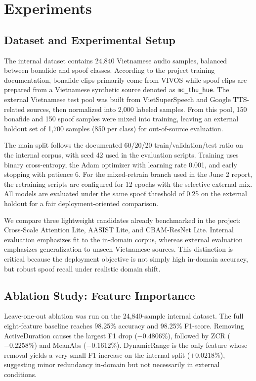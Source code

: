 \documentclass[conference]{IEEEtran}
\begin{document}
\section{Experiments}

\subsection{Dataset and Experimental Setup}

The internal dataset contains 24{,}840 Vietnamese audio samples, balanced between bonafide and spoof classes. According to the project training documentation, bonafide clips primarily come from VIVOS while spoof clips are prepared from a Vietnamese synthetic source denoted as \texttt{mc\_thu\_hue}. The external Vietnamese test pool was built from VietSuperSpeech and Google TTS-related sources, then normalized into 2{,}000 labeled samples. From this pool, 150 bonafide and 150 spoof samples were mixed into training, leaving an external holdout set of 1{,}700 samples (850 per class) for out-of-source evaluation.

The main split follows the documented 60/20/20 train/validation/test ratio on the internal corpus, with seed 42 used in the evaluation scripts. Training uses binary cross-entropy, the Adam optimizer with learning rate 0.001, and early stopping with patience 6. For the mixed-retrain branch used in the June 2 report, the retraining scripts are configured for 12 epochs with the selective external mix. All models are evaluated under the same spoof threshold of 0.25 on the external holdout for a fair deployment-oriented comparison.

We compare three lightweight candidates already benchmarked in the project: Cross-Scale Attention Lite, AASIST Lite, and CBAM-ResNet Lite. Internal evaluation emphasizes fit to the in-domain corpus, whereas external evaluation emphasizes generalization to unseen Vietnamese sources. This distinction is critical because the deployment objective is not simply high in-domain accuracy, but robust spoof recall under realistic domain shift.

\subsection{Ablation Study: Feature Importance}

Leave-one-out ablation was run on the 24{,}840-sample internal dataset. The full eight-feature baseline reaches 98.25\% accuracy and 98.25\% F1-score. Removing ActiveDuration causes the largest F1 drop ($-0.4806\%$), followed by ZCR ($-0.2258\%$) and MeanAbs ($-0.1612\%$). DynamicRange is the only feature whose removal yields a very small F1 increase on the internal split ($+0.0218\%$), suggesting minor redundancy in-domain but not necessarily in external conditions.
\end{document}
